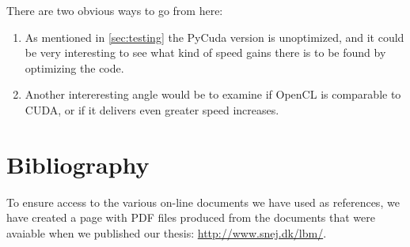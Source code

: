 There are two obvious ways to go from here:

\begin{enumerate}
\item As mentioned in \autoref{sec:testing} the PyCuda version is unoptimized, and it could be very interesting to see what kind of speed gains there is to be found by optimizing the code.
\item Another intereresting angle would be to examine if OpenCL is comparable to CUDA, or if it delivers even greater speed increases.
\end{enumerate}

\newpage


\newpage
\section{Bibliography}

To ensure access to the various on-line documents we have used as references, we have created a page with PDF files produced from the documents that were avaiable when we published our thesis: \url{http://www.snej.dk/lbm/}.






